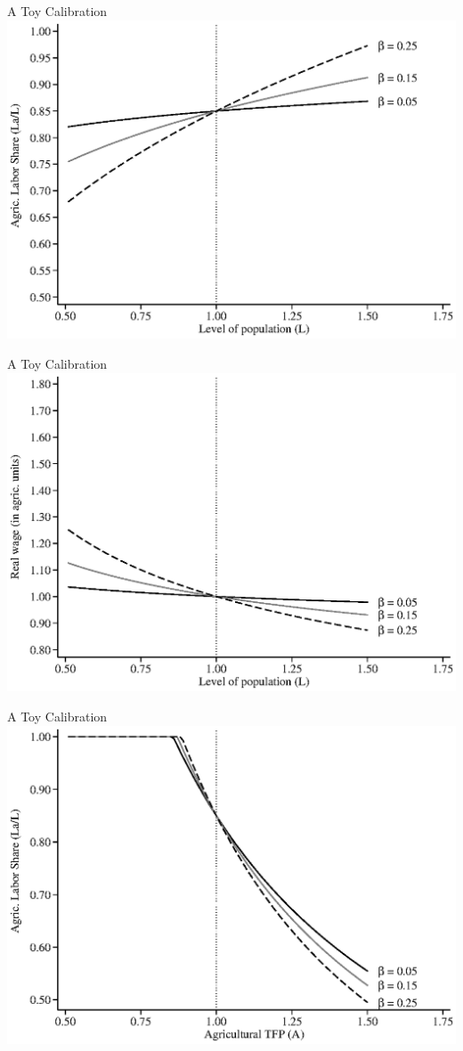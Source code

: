 \documentclass[10pt, xcolor=dvipsnames]{beamer}
\begin{document}
\begin{frame}{A Toy Calibration}
\includegraphics[width=.8\textwidth]{fig_sim_L_LaL.eps}
\end{frame}

\begin{frame}{A Toy Calibration}
\includegraphics[width=.8\textwidth]{fig_sim_L_w.eps}
\end{frame}

\begin{frame}{A Toy Calibration}
\includegraphics[width=.8\textwidth]{fig_sim_A_LaL.eps}
\end{frame}
\end{document}

